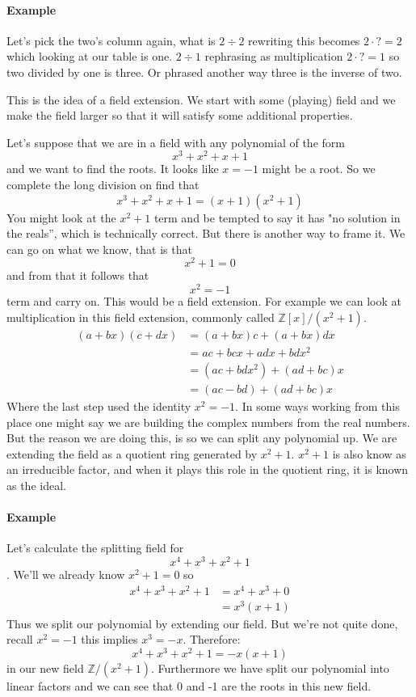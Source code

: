 \documentclass[12pt]{article}
\begin{document}
\paragraph*{Example} Let's pick the two's column again, what is $2 \div 2$ rewriting this becomes $2 \cdot ? = 2$ which looking at our table is one.   $2 \div 1$ rephrasing as multiplication $2 \cdot ? = 1$ so two divided by one is three. Or phrased another way three is the inverse of two.

This is the idea of a field extension.  We start with some (playing) field and we make the field larger so that it will satisfy some additional properties.  

Let's suppose that we are in a field with any polynomial of the form $$x^3+x^2+x+1$$ and we want to find the roots.  It looks like $x=-1$ might be a root. So we complete the long division on find that
$$x^3+x^2+x+1 = (x+1)(x^2+1)$$ 
You might look at the $x^2+1$ term and be tempted to say it has "no solution in the reals'', which is technically correct.  But there is another way to frame it.  We can go on what we know, that is that $$x^2+1=0$$ and from that it follows that $$x^2=-1$$ term and carry on.  This would be a field extension.  For example we can look at multiplication in this field extension, commonly called $\mathbb{Z}[x]/(x^2+1)$.
\begin{align*}
(a+bx)(c+dx) & = (a+bx)c + (a+bx)dx \\
&= ac + bcx + adx +bdx^2 \\
&= (ac+bdx^2) + (ad + bc)x \\
&= (ac-bd) + (ad + bc)x
\end{align*}
Where the last step used the identity $x^2=-1$.  In some ways working from this place one might say we are building the complex numbers from the real numbers.  But the reason we are doing this, is so we can split any polynomial up.  We are extending the field as a quotient ring generated by $x^2+1$.  $x^2+1$ is also know as an irreducible factor, and when it plays this role in the quotient ring, it is known as the ideal.

\paragraph*{Example} Let's calculate the splitting field for $$x^4+x^3+x^2+1$$.  We'll we already know $x^2+1=0$ so
\begin{align*}
x^4+x^3+x^2+1 &= x^4 + x^3 + 0 \\
&= x^3(x+1)
\end{align*}
Thus we split our polynomial by extending our field.  But we're not quite done, recall $x^2=-1$ this implies $x^3 = -x$.  Therefore:
$$x^4+x^3+x^2+1 = -x(x+1)$$ in our new field $\mathbb{Z}/(x^2+1)$.  Furthermore we have split our polynomial into linear factors and we can see that 0 and -1 are the roots in this new field.
\end{document}

